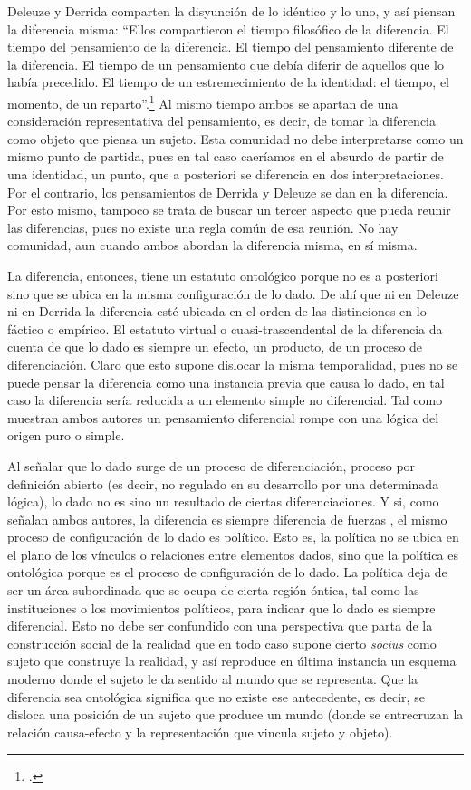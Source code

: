 Deleuze y Derrida comparten la disyunción de lo idéntico y lo uno, y así piensan la diferencia misma: \enquote{Ellos compartieron el tiempo filosófico de la diferencia. El tiempo del pensamiento de la diferencia. El tiempo del pensamiento diferente de la diferencia. El tiempo de un pensamiento que debía diferir de aquellos que lo había precedido. El tiempo de un estremecimiento de la identidad: el tiempo, el momento, de un reparto}.\footcite[250]{@6986-NANCY2008} Al mismo tiempo ambos se apartan de una consideración representativa del pensamiento, es decir, de tomar la diferencia como objeto que piensa un sujeto. Esta comunidad no debe interpretarse como un mismo punto de partida, pues en tal caso caeríamos en el absurdo de partir de una identidad, un punto, que a posteriori se diferencia en dos interpretaciones. Por el contrario, los pensamientos de Derrida y Deleuze se dan en la diferencia. Por esto mismo, tampoco se trata de buscar un tercer aspecto que pueda reunir las diferencias, pues no existe una regla común de esa reunión. No hay comunidad, aun cuando ambos abordan la diferencia misma, en sí misma.

La diferencia, entonces, tiene un estatuto ontológico porque no es a posteriori sino que se ubica en la misma configuración de lo dado. De ahí que ni en Deleuze ni en Derrida la diferencia esté ubicada en el orden de las distinciones en lo fáctico o empírico. El estatuto virtual o cuasi-trascendental de la diferencia da cuenta de que lo dado es siempre un efecto, un producto, de un proceso de diferenciación. Claro que esto supone dislocar la misma temporalidad, pues no se puede pensar la diferencia como una instancia previa que causa lo dado, en tal caso la diferencia sería reducida a un elemento simple no diferencial. Tal como muestran ambos autores un pensamiento diferencial rompe con una lógica del origen puro o simple.

Al señalar que lo dado surge de un proceso de diferenciación, proceso por definición abierto (es decir, no regulado en su desarrollo por una determinada lógica), lo dado no es sino un resultado de ciertas diferenciaciones. Y si, como señalan ambos autores, la diferencia es siempre diferencia de fuerzas , el mismo proceso de configuración de lo dado es político. Esto es, la política no se ubica en el plano de los vínculos o relaciones entre elementos dados, sino que la política es ontológica porque es el proceso de configuración de lo dado. La política deja de ser un área subordinada que se ocupa de cierta región óntica, tal como las instituciones o los movimientos políticos, para indicar que lo dado es siempre diferencial. Esto no debe ser confundido con una perspectiva que parta de la construcción social de la realidad que en todo caso supone cierto \emph{socius} como sujeto que construye la realidad, y así reproduce en última instancia un esquema moderno donde el sujeto le da sentido al mundo que se representa. Que la diferencia sea ontológica significa que no existe ese antecedente, es decir, se disloca una posición de un sujeto que produce un mundo (donde se entrecruzan la relación causa-efecto y la representación que vincula sujeto y objeto).

